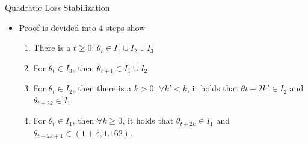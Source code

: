 \documentclass[fleqn]{beamer}
\begin{document}
    \begin{frame}{Quadratic Loss Stabilization}
        \begin{itemize}
            \item Proof is devided into 4 steps show
                \begin{enumerate}
                    \item There is a $t\ge 0$: $\theta_t \in I_1\cup
                        I_2\cup I_3$
                    \item For $\theta_t \in I_3$, then $\theta_{t+1} \in I_1
                        \cup I_2$.
                    \item For $\theta_t \in I_2$, then there is a $k>0$:
                        $\forall k' < k$, it holds that $\theta{t+2k'} \in
                        I_2$ and $\theta_{t+2k} \in I_1$
                    \item For $\theta_t \in I_1$, then $\forall k \ge 0$, it
                        holds that
                        $\theta_{t+2k} \in I_1$ and $\theta_{t+2k+1} \in
                        (1+\varepsilon, 1.162)$.
                \end{enumerate}
        \end{itemize}
    \end{frame}
\end{document}

